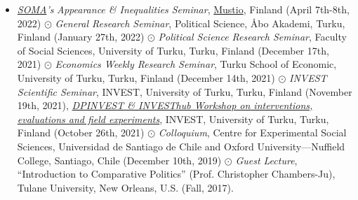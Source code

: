 \begin{itemize}
	\item[] \emph{\href{https://soma.utu.fi/en}{SOMA}'s} \emph{Appearance \& Inequalities Seminar}, \href{https://www.mustionlinna.fi/en/}{Mustio}, Finland (April 7th-8th, 2022) $\odot$ \emph{General Research Seminar}, Political Science, \AA bo Akademi, Turku, Finland (January 27th, 2022) $\odot$ \emph{Political Science Research Seminar}, Faculty of Social Sciences, University of Turku, Turku, Finland (December 17th, 2021) $\odot$ \emph{Economics Weekly Research Seminar}, Turku School of Economic, University of Turku, Turku, Finland (December 14th, 2021) $\odot$ \emph{INVEST Scientific Seminar}, INVEST, University of Turku, Turku, Finland (November 19th, 2021), \href{https://invest.utu.fi/events/dpinvest-investhub-workshop-on-interventions-evaluations-and-field-experiments/}{\emph{DPINVEST \& INVESThub Workshop on interventions, evaluations and field experiments}}, INVEST, University of Turku, Turku, Finland (October 26th, 2021) $\odot$ \emph{Colloquium}, Centre for Experimental Social Sciences, Universidad de Santiago de Chile and Oxford University---Nuffield College, Santiago, Chile (December 10th, 2019) $\odot$ \emph{Guest Lecture},  ``Introduction to Comparative Politics'' (Prof. Christopher Chambers-Ju), Tulane University, New Orleans, U.S. (Fall, 2017).
\end{itemize}
